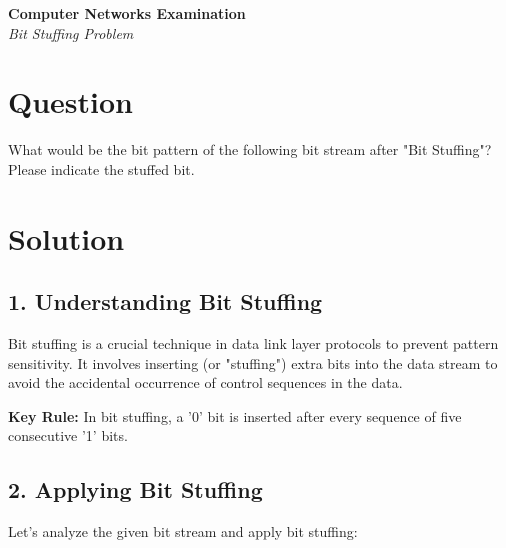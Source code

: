 \documentclass[12pt,a4paper]{article}
\newcommand{\bitstuff}[1]{\textcolor{red}{\textbf{#1}}}
\begin{document}
\begin{center}
\Large\textbf{Computer Networks Examination}
\\\vspace{0.5cm}
\large\textit{Bit Stuffing Problem}
\end{center}

\section*{Question}
What would be the bit pattern of the following bit stream after "Bit Stuffing"? Please indicate the stuffed bit.

\begin{center}
\end{center}

\section*{Solution}

\subsection*{1. Understanding Bit Stuffing}
Bit stuffing is a crucial technique in data link layer protocols to prevent pattern sensitivity. It involves inserting (or "stuffing") extra bits into the data stream to avoid the accidental occurrence of control sequences in the data.

\textbf{Key Rule:} In bit stuffing, a '0' bit is inserted after every sequence of five consecutive '1' bits.

\subsection*{2. Applying Bit Stuffing}
Let's analyze the given bit stream and apply bit stuffing:

\begin{center}
\end{center}
\end{document}
